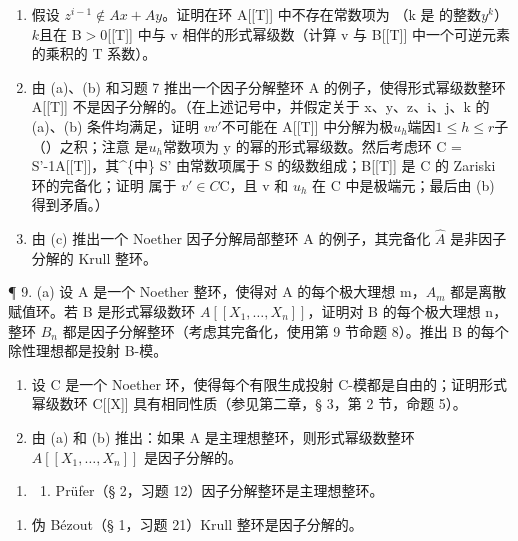 \begin{enumerate}
\def\labelenumi{(\alph{enumi})}
\setcounter{enumi}{1}
\item
  假设 \(z^{i-1} \notin Ax + Ay\)。证明在环 A[[T]] 中{不}{}{存}{}在常数项为 （k 是  的整数\(y^k\)）\(k\)且在 B\(>0\)[[T]] 中与 v 相伴的形式幂级{}{数}{}{（}计算 v 与 B[[T]] 中一个可逆元素的乘积的 T 系{数}{}）{}{}。
\item
  由 (a)、(b) 和习题 7 推出一个因子分解整环 A 的例子，使得形式幂级数整环 A[[T{}{]}{}{]} 不是因子分解的。（在上述记号中，并假定关于 x、y、z、i、j、k 的 (a)、(b) 条件均满足，证明  \(vv'\)不可能在 A[[T]] 中分解为极\(u_{h}\)端因\(1 \leqslant h \leqslant r\)子 {（}{}）{}{之}积；注意  是\(u_{h}\)常数项为 y 的幂的形式幂级数。然后考虑环 C = S'-1A[[T]]，其\^{}\{中\} {}{}S{}{'} 由常数项属于 S 的级数组成；B[[T]] 是 C{}{ }{的}{} Zariski 环的完备化；证明  属于 \(v' \in C\)C，且 v 和 \(u_{h}\) 在 C 中是极端元；最后由 (b) 得到矛盾。）
\item
  由 (c) 推出一个 Noether 因子分解局部整环 A 的例子，其完备化 \(\hat{A}\) 是非因子分解的 Krull 整环。
\end{enumerate}

¶ 9. (a) 设 A 是一个 Noether 整环，使得对 A 的每个极大理想 m，\(A_{m}\) 都是离散赋值环。若 B 是形式幂级数环 \(A[[X_{1},\ldots,X_{n}]]\)，证明对 B 的每个极大理想 n，整环 \(B_{n}\) 都是因子分解整环（考虑其完备化，使用第 9 节命题 8）。推出 B 的每个除性理想都是投射 B-模。

\begin{enumerate}
\def\labelenumi{(\alph{enumi})}
\setcounter{enumi}{1}
\item
  设 C 是一个 Noether 环，使得每个有限生成投射 C-模都是自由的；证明形式幂级数环 C{[}{[}X{]}{]} 具有相同性质（参见第二章，§ 3，第 2 节，命题 5）。
\item
  由 (a) 和 (b) 推出：如果 A 是主理想整环，则形式幂级数整环 \(A[[X_{1},\ldots,X_{n}]]\) 是因子分解的。
\end{enumerate}

\begin{enumerate}
\def\labelenumi{\arabic{enumi}.}
\setcounter{enumi}{9}
\tightlist
\item
  \begin{enumerate}
  \def\labelenumii{(\alph{enumii})}
  \tightlist
  \item
    Prüfer（§ 2，习题 12）因子分解整环是主理想整环。
  \end{enumerate}
\end{enumerate}

\begin{enumerate}
\def\labelenumi{(\alph{enumi})}
\setcounter{enumi}{1}
\tightlist
\item
  伪 Bézout（§ 1，习题 21）Krull 整环是因子分解的。
\end{enumerate}

